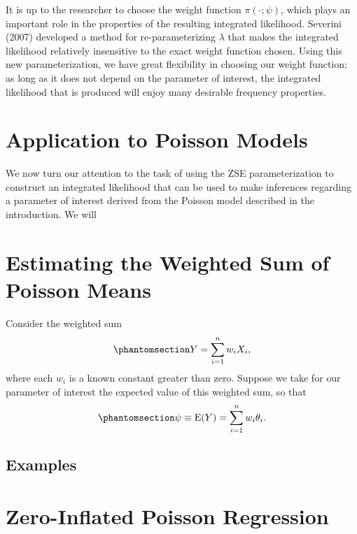 \documentclass[
  12pt]{article}
\begin{document}
It is up to the researcher to choose the weight function
\(\pi(\cdot; \psi)\), which plays an important role in the properties of
the resulting integrated likelihood. Severini (2007) developed a method
for re-parameterizing \(\lambda\) that makes the integrated likelihood
relatively insensitive to the exact weight function chosen. Using this
new parameterization, we have great flexibility in choosing our weight
function; as long as it does not depend on the parameter of interest,
the integrated likelihood that is produced will enjoy many desirable
frequency properties.

\section{Application to Poisson
Models}\label{application-to-poisson-models}

We now turn our attention to the task of using the ZSE parameterization
to construct an integrated likelihood that can be used to make
inferences regarding a parameter of interest derived from the Poisson
model described in the introduction. We will

\section{Estimating the Weighted Sum of Poisson
Means}\label{estimating-the-weighted-sum-of-poisson-means}

Consider the weighted sum \begin{equation}\phantomsection\label{eq-3-1}{
Y = \sum_{i=1}^n w_iX_i,
}\end{equation} where each \(w_i\) is a known constant greater than
zero. Suppose we take for our parameter of interest the expected value
of this weighted sum, so that
\begin{equation}\phantomsection\label{eq-3-2}{
\psi \equiv \text{E}(Y) = \sum_{i=1}^n w_i\theta_i.
}\end{equation}

\subsection{Examples}\label{examples}

\section{Zero-Inflated Poisson
Regression}\label{zero-inflated-poisson-regression}
\end{document}
